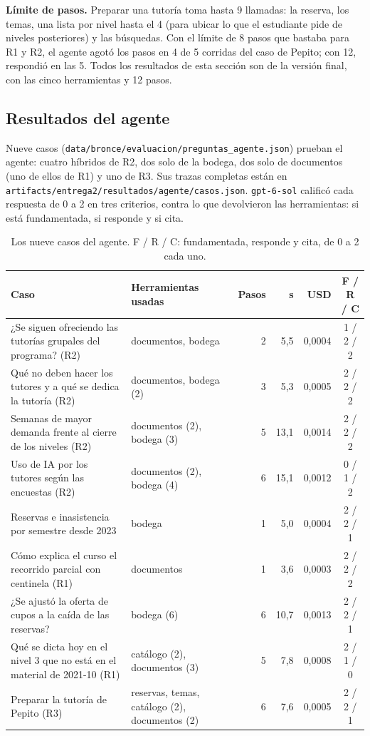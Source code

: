 \documentclass[11pt,letterpaper]{article}
\newcommand{\cod}[1]{\texttt{\small #1}}
\begin{document}
\textbf{Límite de pasos.} Preparar una tutoría toma hasta 9 llamadas: la reserva, los temas, una lista por nivel hasta el 4 (para ubicar lo que el estudiante pide de niveles posteriores) y las búsquedas. Con el límite de 8 pasos que bastaba para R1 y R2, el agente agotó los pasos en 4 de 5 corridas del caso de Pepito; con 12, respondió en las 5. Todos los resultados de esta sección son de la versión final, con las cinco herramientas y 12 pasos.

\subsection{Resultados del agente}

Nueve casos (\cod{data/bronce/evaluacion/preguntas\_agente.json}) prueban el agente: cuatro híbridos de R2, dos solo de la bodega, dos solo de documentos (uno de ellos de R1) y uno de R3. Sus trazas completas están en \cod{artifacts/entrega2/resultados/agente/casos.json}. \cod{gpt-6-sol} calificó cada respuesta de 0 a 2 en tres criterios, contra lo que devolvieron las herramientas: si está fundamentada, si responde y si cita.

\begin{table}[H]\small\renewcommand{\arraystretch}{1.15}
\begin{tabularx}{\textwidth}{L>{\raggedright\arraybackslash}p{0.25\textwidth}RRRc}
\toprule
\textbf{Caso} & \textbf{Herramientas usadas} & \textbf{Pasos} & \textbf{s} & \textbf{USD} & \textbf{F / R / C} \\
\midrule
¿Se siguen ofreciendo las tutorías grupales del programa? (R2) & documentos, bodega & 2 & 5,5 & 0,0004 & 1 / 2 / 2 \\
Qué no deben hacer los tutores y a qué se dedica la tutoría (R2) & documentos, bodega (2) & 3 & 5,3 & 0,0005 & 2 / 2 / 2 \\
Semanas de mayor demanda frente al cierre de los niveles (R2) & documentos (2), bodega (3) & 5 & 13,1 & 0,0014 & 2 / 2 / 2 \\
Uso de IA por los tutores según las encuestas (R2) & documentos (2), bodega (4) & 6 & 15,1 & 0,0012 & 0 / 1 / 2 \\
Reservas e inasistencia por semestre desde 2023 & bodega & 1 & 5,0 & 0,0004 & 2 / 2 / 1 \\
Cómo explica el curso el recorrido parcial con centinela (R1) & documentos & 1 & 3,6 & 0,0003 & 2 / 2 / 2 \\
¿Se ajustó la oferta de cupos a la caída de las reservas? & bodega (6) & 6 & 10,7 & 0,0013 & 2 / 2 / 1 \\
Qué se dicta hoy en el nivel 3 que no está en el material de 2021-10 (R1) & catálogo (2), documentos (3) & 5 & 7,8 & 0,0008 & 2 / 1 / 0 \\
Preparar la tutoría de Pepito (R3) & reservas, temas, catálogo (2), documentos (2) & 6 & 7,6 & 0,0005 & 2 / 2 / 1 \\
\bottomrule
\end{tabularx}
\caption{Los nueve casos del agente. F / R / C: fundamentada, responde y cita, de 0 a 2 cada uno.}
\label{tab:agente}
\end{table}
\end{document}
